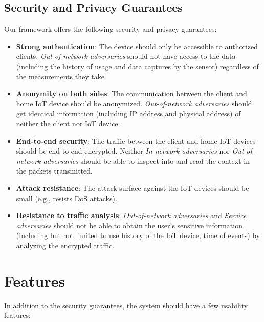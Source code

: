 \subsection{Security and Privacy Guarantees}

Our framework offers the following security and privacy guarantees:

\begin{itemize}
	\item \textbf{Strong authentication}: The device should only be accessible to authorized clients. \textit{Out-of-network adversaries} should not have access to the data (including the history of usage and data captures by the sensor) regardless of the measurements they take.
	\item \textbf{Anonymity on both sides}: The communication between the client and home IoT device should be anonymized. \textit{Out-of-network adversaries} should  get identical information (including IP address and physical address) of neither the client nor IoT device.
	\item \textbf{End-to-end security}: The traffic between the client and home IoT devices should be end-to-end encrypted. Neither \textit{In-network adversaries} nor \textit{Out-of-network adversaries} should be able to inspect into and read the context in the packets transmitted.
	\item \textbf{Attack resistance}: The attack surface against the IoT devices should be small (e.g., resists DoS attacks).
	\item \textbf{Resistance to traffic analysis}: \textit{Out-of-network adversaries} and \textit{Service adversaries} should not be able to obtain the user's sensitive information (including but not limited to use history of the IoT device, time of events) by analyzing the encrypted traffic.
\end{itemize}

\section{Features}
In addition to the security guarantees, the system should have a few usability features:

